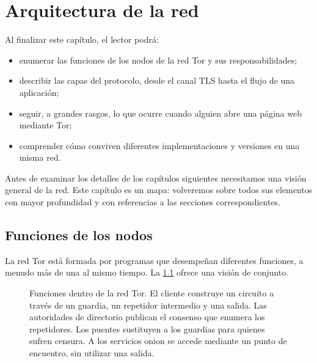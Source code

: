 \chapter{Arquitectura de la red}\label{cap:06-architettura}

\begin{obiettivi}
Al finalizar este capítulo, el lector podrá:
\begin{itemize}[nosep]
  \item enumerar las funciones de los nodos de la red Tor y sus responsabilidades;
  \item describir las capas del protocolo, desde el canal TLS hasta el flujo de una aplicación;
  \item seguir, a grandes rasgos, lo que ocurre cuando alguien abre una página web mediante Tor;
  \item comprender cómo conviven diferentes implementaciones y versiones en una misma red.
\end{itemize}
\end{obiettivi}

Antes de examinar los detalles de los capítulos siguientes necesitamos una visión general de la red. Este capítulo es un mapa: volveremos sobre todos sus elementos con mayor profundidad y con referencias a las secciones correspondientes.

\section{Funciones de los nodos}\label{sec:arch-ruoli}

La red Tor está formada por programas que desempeñan diferentes funciones, a menudo más de una al mismo tiempo. La \cref{fig:arch-ruoli} ofrece una visión de conjunto.

\begin{figure}[htbp]
\centering

\caption{Funciones dentro de la red Tor. El cliente construye un circuito a través de un guardia, un repetidor intermedio y una salida. Las autoridades de directorio publican el consenso que enumera los repetidores. Los puentes sustituyen a los guardias para quienes sufren censura. A los servicios onion se accede mediante un punto de encuentro, sin utilizar una salida.}
\label{fig:arch-ruoli}
\end{figure}

